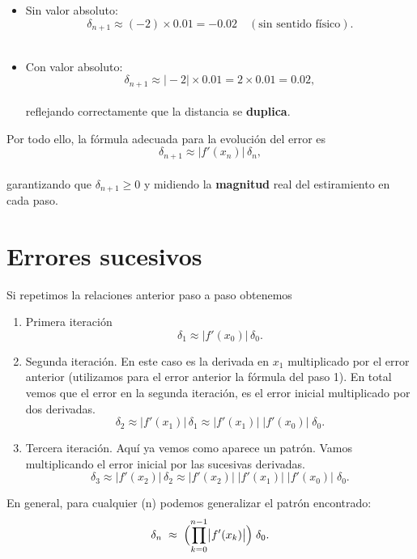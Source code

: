 \documentclass[
  11pt,
  a4paper,
  DIV=11,
  numbers=noendperiod]{scrreprt}
\providecommand{\tightlist}{%
  \setlength{\itemsep}{0pt}\setlength{\parskip}{0pt}}
\begin{document}
\begin{itemize}
\tightlist
\item
  Sin valor absoluto:\\
  \[
  \delta_{n+1}\approx(-2)\times0.01=-0.02\quad(\text{sin sentido físico}).
  \]\\
\item
  Con valor absoluto:\\
  \[
  \delta_{n+1}\approx\bigl|-2\bigr|\times0.01=2\times0.01=0.02,
  \]\\
  reflejando correctamente que la distancia se \textbf{duplica}.
\end{itemize}

Por todo ello, la fórmula adecuada para la evolución del error es\\
\[
\delta_{n+1} \approx \bigl|f'(x_n)\bigr|\,\delta_n,
\]\\
garantizando que \(\delta_{n+1}\ge0\) y midiendo la \textbf{magnitud}
real del estiramiento en cada paso.

\section{Errores sucesivos}\label{errores-sucesivos}

Si repetimos la relaciones anterior paso a paso obtenemos

\begin{enumerate}
\def\labelenumi{\arabic{enumi}.}
\item
  Primera iteración\\
  \[
  \delta_1 \approx \bigl|f'(x_0)\bigr|\,\delta_0.
  \]
\item
  Segunda iteración. En este caso es la derivada en \(x_1\) multiplicado
  por el error anterior (utilizamos para el error anterior la fórmula
  del paso 1). En total vemos que el error en la segunda iteración, es
  el error inicial multiplicado por dos derivadas. \[
  \delta_2
  \approx \bigl|f'(x_1)\bigr|\,\delta_1
  \approx \bigl|f'(x_1)\bigr|\;\bigl|f'(x_0)\bigr|\;\delta_0.
  \]
\item
  Tercera iteración. Aquí ya vemos como aparece un patrón. Vamos
  multiplicando el error inicial por las sucesivas derivadas. \[
  \delta_3
  \approx \bigl|f'(x_2)\bigr|\,\delta_2
  \approx \bigl|f'(x_2)\bigr|\;\bigl|f'(x_1)\bigr|\;\bigl|f'(x_0)\bigr|\;\delta_0.
  \]
\end{enumerate}

En general, para cualquier (n) podemos generalizar el patrón
encontrado:\\
\[
\delta_n
\;\approx\;
\Bigl(\prod_{k=0}^{n-1}\bigl|f'(x_k)\bigr|\Bigr)\;\delta_0.
\]
\end{document}
